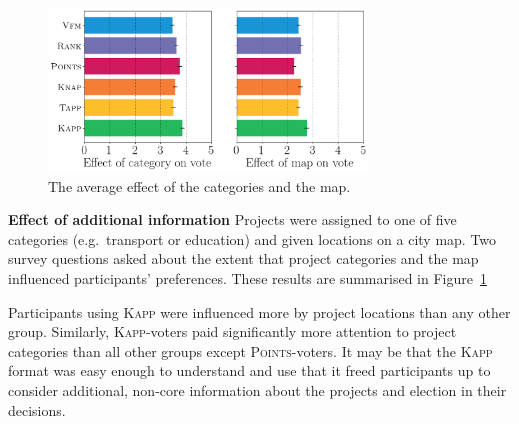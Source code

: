 \documentclass[letterpaper]{article} %
\newcommand{\points}{\textsc{Points}}
\newcommand{\kapp}{\textsc{Kapp}}
\begin{document}
\begin{figure}[!h]
\begin{center}
\includegraphics[width=8.5cm]{experiment/survey2.png}
\caption{The average effect of the categories and the map.
}\label{fig:cat_map}
\end{center}\vspace{-5mm}
\end{figure}


\textbf{Effect of additional information}
Projects were assigned to one of five categories (e.g.\ transport or education) and given locations on a city map. Two survey questions asked about the extent that project categories and the map influenced participants' preferences. These results are summarised in Figure~\ref{fig:cat_map}

Participants using \kapp{} were influenced  more by project locations than any other group. Similarly, \kapp-voters paid significantly more attention to project categories than all other groups except \points-voters. 
It may be that the \kapp{} format was easy enough to understand and use that it freed participants up to consider additional, non-core information about the projects and   election in their decisions. 



\end{document}
